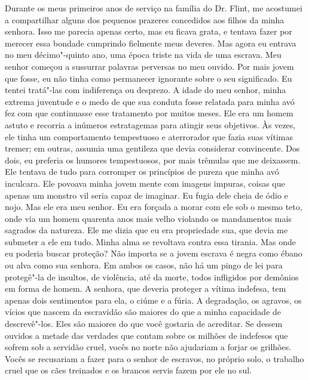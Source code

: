 Durante os meus primeiros anos de
serviço na família do Dr. Flint, me acostumei a compartilhar alguns dos
pequenos prazeres concedidos aos filhos da minha senhora. Isso me
parecia apenas certo, mas eu ficava grata, e tentava fazer por merecer
essa bondade cumprindo fielmente meus deveres. Mas agora eu entrava no
meu décimo"-quinto ano, uma época triste na vida de uma escrava. Meu
senhor começou a sussurrar palavras perversas no meu ouvido. Por mais
jovem que fosse, eu não tinha como permanecer ignorante sobre o seu
significado. Eu tentei tratá"-las com indiferença ou desprezo. A idade do
meu senhor, minha extrema juventude e o medo de que sua conduta fosse
relatada para minha avó fez com que continuasse esse tratamento por
muitos meses. Ele era um homem astuto e recorria a inúmeros estratagemas
para atingir seus objetivos. Às vezes, ele tinha um comportamento
tempestuoso e aterrorador que fazia suas vítimas tremer; em outras,
assumia uma gentileza que devia considerar convincente. Dos dois, eu
preferia os humores tempestuosos, por mais trêmulas que me deixassem.
Ele tentava de tudo para corromper os princípios de pureza que minha avó
inculcara. Ele povoava minha jovem mente com imagens impuras, coisas que
apenas um monstro vil seria capaz de imaginar. Eu fugia dele cheia de
ódio e nojo. Mas ele era meu senhor. Eu era forçada a morar com ele sob
o mesmo teto, onde via um homem quarenta anos mais velho violando os
mandamentos mais sagrados da natureza. Ele me dizia que eu era
propriedade sua, que devia me submeter a ele em tudo. Minha alma se
revoltava contra essa tirania. Mas onde eu poderia buscar proteção? Não
importa se a jovem escrava é negra como ébano ou alva como sua senhora.
Em ambos os casos, não há um pingo de lei para protegê"-la de insultos,
de violência, até da morte, todos infligidos por demônios em forma de
homem. A senhora, que deveria proteger a vítima indefesa, tem apenas
dois sentimentos para ela, o ciúme e a fúria. A degradação, os agravos,
os vícios que nascem da escravidão são maiores do que a minha capacidade
de descrevê"-los. Eles são maiores do que você gostaria de acreditar.
Se dessem ouvidos a metade das
verdades que contam sobre os milhões de indefesos que sofrem sob a
servidão cruel, vocês no norte não ajudariam a forjar os grilhões. Vocês
se recusariam a fazer para o senhor de escravos, no próprio solo, o
trabalho cruel que os cães treinados e os brancos servis fazem por ele
no sul.

